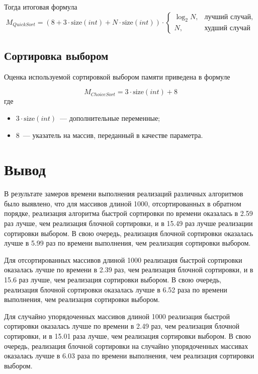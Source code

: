 Тогда итоговая формула
\begin{equation}
	\label{eqn:mem-qsort}
	M_{QuickSort} = (8 + 3 \cdot \text{size}(int) + N \cdot \text{size}(int)) \cdot
	\begin{cases}
		\log_2{N}, & \text{лучший случай}, \\
		N, & \text{худший случай}
	\end{cases}
\end{equation}

\subsection{Сортировка выбором}

Оценка используемой сортировкой выбором памяти приведена в формуле

\begin{equation}
	M_{ChoiceSort} = 3 \cdot \text{size}(int) + 8
\end{equation}
где
\begin{itemize}
	\item $3 \cdot \text{size}(int)$~--- дополнительные переменные;
	\item $8$~--- указатель на массив, переданный в качестве параметра.
\end{itemize}


\section*{Вывод}

В результате замеров времени выполнения реализаций различных алгоритмов было выявлено, что для массивов длиной 1000, отсортированных в обратном порядке, реализация алгоритма быстрой сортировки по времени оказалась в 2.59 раз лучше, чем реализация блочной сортировки, и в 15.49 раз лучше реализации сортировки выбором. 
В свою очередь, реализация блочной сортировки оказалась лучше в 5.99 раз по времени выполнения, чем реализация  сортировки выбором.

Для отсортированных массивов длиной 1000 реализация быстрой сортировки оказалась лучше по времени в 2.39 раз, чем реализация блочной сортировки, и в 15.6 раз лучше, чем реализация сортировки выбором. 
В свою очередь, реализация блочной сортировки оказалась лучше в 6.52 раза по времени выполнения, чем реализация сортировки выбором.

Для случайно упорядоченных массивов длиной 1000 реализация быстрой сортировки оказалась лучше по времени в 2.49 раз, чем реализация блочной сортировки, и в 15.01 раза лучше, чем реализация сортировки выбором. 
В свою очередь, реализация блочной сортировки на случайно упорядоченных массивах оказалась лучше в 6.03 раза по времени выполнения, чем реализация сортировки выбором.

